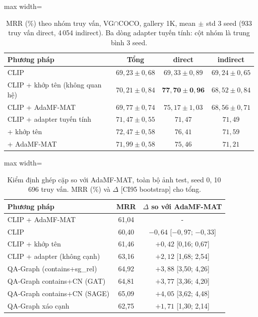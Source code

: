 \documentclass[conference]{IEEEtran}
\begin{document}
\begin{table}[t]
\caption{MRR (\%) theo nhóm truy vấn, VG$\cap$COCO, gallery 1K, mean$\,\pm\,$std 3 seed (933 truy vấn direct, 4\,054 indirect). Ba dòng adapter tuyến tính: cột nhóm là trung bình 3 seed.}\label{tab:l2}
\centering\small
\begin{adjustbox}{max width=\columnwidth}
\begin{tabular}{lccc}
\toprule
Phương pháp & Tổng & direct & indirect\\\midrule
CLIP & $69{,}23\pm0{,}68$ & $69{,}33\pm0{,}89$ & $69{,}24\pm0{,}65$\\
CLIP + khớp tên (không quan hệ) & $70{,}21\pm0{,}84$ & $\mathbf{77{,}70\pm0{,}96}$ & $68{,}52\pm0{,}84$\\
CLIP + AdaMF-MAT & $69{,}77\pm0{,}74$ & $75{,}17\pm1{,}03$ & $68{,}56\pm0{,}71$\\\midrule
CLIP + adapter tuyến tính & $71{,}47\pm0{,}55$ & $71{,}47$ & $71{,}49$\\
+ khớp tên & $72{,}47\pm0{,}58$ & $76{,}41$ & $71{,}59$\\
+ AdaMF-MAT & $71{,}99\pm0{,}58$ & $75{,}46$ & $71{,}21$\\\bottomrule
\end{tabular}
\end{adjustbox}
\end{table}

\begin{table}[t]
\caption{Kiểm định ghép cặp so với AdaMF-MAT, toàn bộ ảnh test, seed 0, 10\,696 truy vấn. MRR (\%) và $\Delta$ [CI95 bootstrap] cho tổng.}\label{tab:paired}
\centering\footnotesize
\setlength{\tabcolsep}{3pt}
\begin{adjustbox}{max width=\columnwidth}
\begin{tabular}{lcc}
\toprule
Phương pháp & MRR & $\Delta$ so với AdaMF-MAT\\\midrule
CLIP + AdaMF-MAT & 61,04 & -\\
CLIP & 60,40 & $-0{,}64$ [$-0{,}97$; $-0{,}33$]\\
CLIP + khớp tên & 61,46 & $+0{,}42$ [0,16; 0,67]\\
CLIP + adapter (không cạnh) & 63,16 & $+2{,}12$ [1,68; 2,54]\\
QA-Graph (contains+sg\_rel) & 64,92 & $+3{,}88$ [3,50; 4,26]\\
QA-Graph contains+CN (GAT) & 64,81 & $+3{,}77$ [3,36; 4,20]\\
QA-Graph contains+CN (SAGE) & 65,09 & $+4{,}05$ [3,62; 4,48]\\
QA-Graph xáo cạnh & 62,75 & $+1{,}71$ [1,30; 2,14]\\\bottomrule
\end{tabular}
\end{adjustbox}
\end{table}
\end{document}
